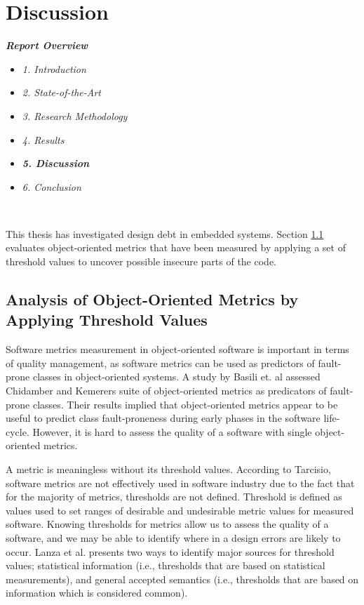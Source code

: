 
\chapter{Discussion}
\label{chap:discussion}

\textit{\textbf{Report Overview}}
\begin{itemize}
	\item \textit{1. Introduction}
	\item \textit{2. State-of-the-Art}
	\item \textit{3. Research Methodology}
	\item \textit{4. Results}
	\item \textit{\textbf{5. Discussion}}
	\item \textit{6. Conclusion}
\end{itemize} \

This thesis has investigated design debt in embedded systems. Section \ref{sec:dis-analysis} evaluates object-oriented metrics that have been measured by applying a set of threshold values to uncover possible insecure parts of the code. 


\section{Analysis of Object-Oriented Metrics by Applying Threshold Values}
\label{sec:dis-analysis}
Software metrics measurement in object-oriented software is important in terms of quality management\cite{tarcisio,ferreira2012identifying}, as software metrics can be used as predictors of fault-prone classes in object-oriented systems\cite{basili1996validation}. A study by Basili et. al\cite{basili1996validation} assessed Chidamber and Kemerers\cite{chidamber1994metrics} suite of object-oriented metrics as predicators of fault-prone classes. Their results implied that object-oriented metrics appear to be useful to predict class fault-proneness during early phases in the software life-cycle. However, it is hard to assess the quality of a software with single object-oriented metrics. 

A metric is meaningless without its threshold values. According to Tarcisio\cite{tarcisio}, software metrics are not effectively used in software industry due to the fact that for the majority of metrics, thresholds are not defined. Threshold is defined as values used to set ranges of desirable and undesirable metric values for measured software\cite{ferreira2012identifying}. Knowing thresholds for metrics allow us to assess the quality of a software, and we may be able to identify where in a design errors are likely to occur. Lanza et al.\cite{lanza2007object} presents two ways to identify major sources for threshold values; statistical information (i.e., thresholds that are based on statistical measurements), and general accepted semantics (i.e., thresholds that are based on information which is considered common).  


